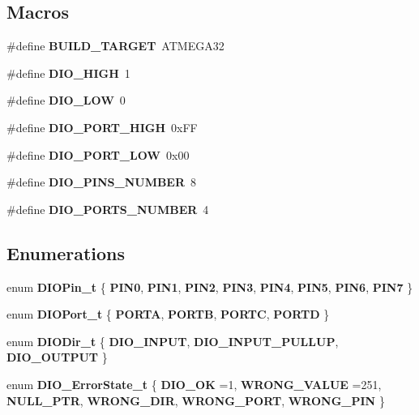 \subsection*{Macros}
\begin{DoxyCompactItemize}
\item 
\#define \textbf{ B\+U\+I\+L\+D\+\_\+\+T\+A\+R\+G\+ET}~A\+T\+M\+E\+G\+A32
\item 
\#define \textbf{ D\+I\+O\+\_\+\+H\+I\+GH}~1
\item 
\#define \textbf{ D\+I\+O\+\_\+\+L\+OW}~0
\item 
\#define \textbf{ D\+I\+O\+\_\+\+P\+O\+R\+T\+\_\+\+H\+I\+GH}~0x\+FF
\item 
\#define \textbf{ D\+I\+O\+\_\+\+P\+O\+R\+T\+\_\+\+L\+OW}~0x00
\item 
\#define \textbf{ D\+I\+O\+\_\+\+P\+I\+N\+S\+\_\+\+N\+U\+M\+B\+ER}~8
\item 
\#define \textbf{ D\+I\+O\+\_\+\+P\+O\+R\+T\+S\+\_\+\+N\+U\+M\+B\+ER}~4
\end{DoxyCompactItemize}
\subsection*{Enumerations}
\begin{DoxyCompactItemize}
\item 
enum \textbf{ D\+I\+O\+Pin\+\_\+t} \{ \newline
\textbf{ P\+I\+N0}, 
\textbf{ P\+I\+N1}, 
\textbf{ P\+I\+N2}, 
\textbf{ P\+I\+N3}, 
\newline
\textbf{ P\+I\+N4}, 
\textbf{ P\+I\+N5}, 
\textbf{ P\+I\+N6}, 
\textbf{ P\+I\+N7}
 \}
\item 
enum \textbf{ D\+I\+O\+Port\+\_\+t} \{ \textbf{ P\+O\+R\+TA}, 
\textbf{ P\+O\+R\+TB}, 
\textbf{ P\+O\+R\+TC}, 
\textbf{ P\+O\+R\+TD}
 \}
\item 
enum \textbf{ D\+I\+O\+Dir\+\_\+t} \{ \textbf{ D\+I\+O\+\_\+\+I\+N\+P\+UT}, 
\textbf{ D\+I\+O\+\_\+\+I\+N\+P\+U\+T\+\_\+\+P\+U\+L\+L\+UP}, 
\textbf{ D\+I\+O\+\_\+\+O\+U\+T\+P\+UT}
 \}
\item 
enum \textbf{ D\+I\+O\+\_\+\+Error\+State\+\_\+t} \{ \newline
\textbf{ D\+I\+O\+\_\+\+OK} =1, 
\textbf{ W\+R\+O\+N\+G\+\_\+\+V\+A\+L\+UE} =251, 
\textbf{ N\+U\+L\+L\+\_\+\+P\+TR}, 
\textbf{ W\+R\+O\+N\+G\+\_\+\+D\+IR}, 
\newline
\textbf{ W\+R\+O\+N\+G\+\_\+\+P\+O\+RT}, 
\textbf{ W\+R\+O\+N\+G\+\_\+\+P\+IN}
 \}
\end{DoxyCompactItemize}
